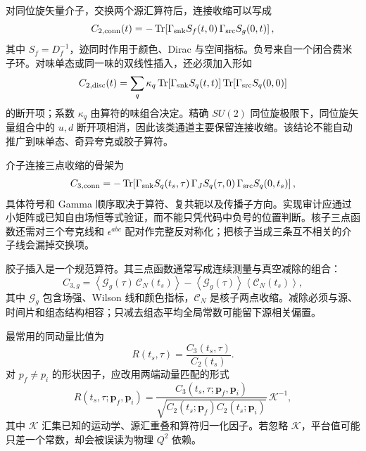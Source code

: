 对同位旋矢量介子，交换两个源汇算符后，连接收缩可以写成
\begin{equation}
  C_{2,\mathrm{conn}}(t)
  =-\operatorname{Tr}\!\left[
  \Gamma_{\rm snk}S_f(t,0)\,
  \Gamma_{\rm src}S_g(0,t)
  \right],
  \label{eq:b02-meson-connected}
\end{equation}
其中 \(S_f=D_f^{-1}\)，迹同时作用于颜色、Dirac 与空间指标。负号来自一个闭合费米子环。对味单态或同一味的双线性插入，还必须加入形如
\begin{equation}
  C_{2,\mathrm{disc}}(t)
  =\sum_q\kappa_q
  \operatorname{Tr}\!\left[\Gamma_{\rm snk}S_q(t,t)\right]
  \operatorname{Tr}\!\left[\Gamma_{\rm src}S_q(0,0)\right]
  \label{eq:b02-meson-disconnected}
\end{equation}
的断开项；系数 \(\kappa_q\) 由算符的味组合决定。精确 \(SU(2)\) 同位旋极限下，同位旋矢量组合中的 \(u,d\) 断开项相消，因此该类通道主要保留连接收缩。该结论不能自动推广到味单态、奇异夸克或胶子算符。

介子连接三点收缩的骨架为
\begin{equation}
  C_{3,\mathrm{conn}}
  =-\operatorname{Tr}\!\left[
  \Gamma_{\rm snk}S_q(t_s,\tau)\,
  \Gamma_JS_q(\tau,0)\,
  \Gamma_{\rm src}S_q(0,t_s)
  \right],
  \label{eq:b02-meson-three-connected}
\end{equation}
具体符号和 Gamma 顺序取决于算符、复共轭以及传播子方向。实现审计应通过小矩阵或已知自由场恒等式验证，而不能只凭代码中负号的位置判断。核子三点函数还需对三个夸克线和 \(\epsilon^{abc}\) 配对作完整反对称化；把核子当成三条互不相关的介子线会漏掉交换项。

胶子插入是一个规范算符。其三点函数通常写成连续测量与真空减除的组合：
\begin{equation}
  C_{3,g}
  =\left\langle
  \mathcal G_g(\tau)\,\mathcal C_N(t_s)
  \right\rangle
  -\left\langle\mathcal G_g(\tau)\right\rangle
  \left\langle\mathcal C_N(t_s)\right\rangle ,
  \label{eq:b02-glue-vacuum}
\end{equation}
其中 \(\mathcal G_g\) 包含场强、Wilson 线和颜色指标，\(\mathcal C_N\) 是核子两点收缩。减除必须与源、时间片和组态结构相容；只减去组态平均全局常数可能留下源相关偏置。

最常用的同动量比值为
\begin{equation}
  R(t_s,\tau)
  =\frac{C_3(t_s,\tau)}{C_2(t_s)}.
  \label{eq:b02-ratio-simple}
\end{equation}
对 \(p_f\neq p_i\) 的形状因子，应改用两端动量匹配的形式
\begin{equation}
  R(t_s,\tau;\mathbf p_f,\mathbf p_i)
  =\frac{C_3(t_s,\tau;\mathbf p_f,\mathbf p_i)}
  {\sqrt{C_2(t_s;\mathbf p_f)C_2(t_s;\mathbf p_i)}}\,
  \mathcal K^{-1},
  \label{eq:b02-ratio-transition}
\end{equation}
其中 \(\mathcal K\) 汇集已知的运动学、源汇重叠和算符归一化因子。若忽略 \(\mathcal K\)，平台值可能只差一个常数，却会被误读为物理 \(Q^2\) 依赖。

